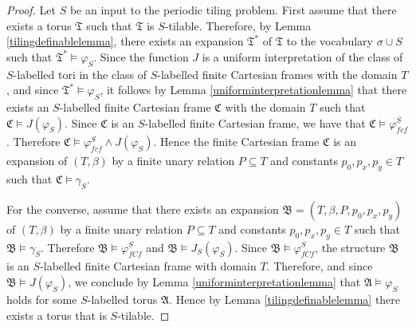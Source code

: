 \documentclass{LMCS}
\theoremstyle{plain}
\newcommand{\mf}{\mathfrak}
\newcommand{\mi}{\mathit}
\begin{document}
\begin{proof}
%
Let $S$ be an input to the periodic tiling problem. First assume that there exists a torus $\mf{T}$ such that $\mf{T}$ is $S$-tilable.
%
Therefore, by Lemma \ref{tilingdefinablelemma}, there exists an expansion $\mf{T}^*$ of $\mf{T}$ to the vocabulary $\sigma\cup S$ such that
%
$\mf{T}^*\models \varphi_S$. Since the function $J$ is a uniform interpretation of
%
the class of $S$-labelled tori in the class of $S$-labelled
%
finite Cartesian frames with the domain $T$, and since
%
 $\mf{T}^*\models\varphi_S$,
%
it follows by Lemma \ref{uniforminterpretationlemma} that there exists an $S$-labelled finite Cartesian frame $\mf{C}$ with the
%
domain $T$ such that $\mf{C}\models J(\varphi_S)$.
%
Since $\mf{C}$ is an $S$-labelled finite Cartesian frame,
%
we have that $\mf{C}\models\varphi^S_\mi{fcf}$.
%
Therefore $\mf{C}\models\varphi^S_\mi{fcf}\wedge J(\varphi_S)$. Hence the
%
finite Cartesian frame $\mf{C}$ is an
%
expansion of $(T,\beta)$ by a finite unary relation $P\subseteq T$ and constants $p_0,p_x,p_y\in T$ such that
%
 $\mf{C}\models\gamma_S$.
%
%


For the converse, assume that there exists an expansion $\mf{B}=(T,\beta,P,p_0,p_x,p_y)$ of $(T,\beta)$ by a finite unary relation $P\subseteq T$ and constants $p_0,p_x,p_y\in T$ such that $\mf{B}\models\gamma_S$.
Therefore $\mf{B}\models\varphi^S_\mi{fCf}$ and $\mf{B}\models J_S(\varphi_S)$. Since $\mf{B}\models\varphi^S_\mi{fCf}$, the structure $\mf{B}$ is an
$S$-labelled finite Cartesian frame with domain $T$. Therefore, and since $\mf{B}\models J(\varphi_S)$, we conclude by Lemma \ref{uniforminterpretationlemma} that $\mf{A}\models\varphi_S$ holds
for some $S$-labelled torus
%
$\mf{A}$.
%
Hence by Lemma \ref{tilingdefinablelemma}
%
there exists a torus that is $S$-tilable.
%
\end{proof}
%



%
\end{document}
